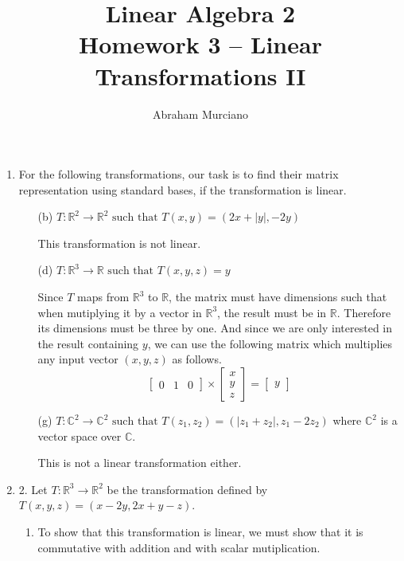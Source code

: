 \documentclass{article}
\title{Linear Algebra 2 \\
\medskip
\large Homework 3 -- Linear Transformations II}
\author{Abraham Murciano}
\newenvironment{answers}{ %
	\begin{enumerate}
		\setlength{\itemsep}{\bigskipamount}
}{\end{enumerate}}
\newcommand{\R}{\mathbb{R}}
\newcommand{\C}{\mathbb{C}}
\newcommand{\st}{\text{ such that }}
\begin{document}
\maketitle

\begin{answers}

	\item
		For the following transformations, our task is to find their matrix representation using standard bases, if the transformation is linear.
		\begin{enumerate}
			\item[(b)]
				\(T : \R^2 \to \R^2 \st T(x, y) = (2x + |y|, -2y)\)

				This transformation is not linear.

			\item[(d)]
				\(T : \R^3 \to \R \st T(x, y, z) = y\)

				Since \(T\) maps from \(\R^3\) to \(\R\), the matrix must have dimensions such that when mutiplying it by a vector in \(\R^3\), the result must be in \(\R\). Therefore its dimensions must be three by one. And since we are only interested in the result containing \(y\), we can use the following matrix which multiplies any input vector \((x, y, z)\) as follows.
				\begin{equation*}
					\left[ \begin{matrix}
							0 & 1 & 0
						\end{matrix} \right]
					\times
					\left[ \begin{matrix}
							x \\ y \\ z
						\end{matrix} \right]
					=
					\left[ \begin{matrix}
							y
						\end{matrix} \right]
				\end{equation*}

			\item[(g)]
				\(T : \C^2 \to \C^2 \st T(z_1, z_2) = (|z_1 + z_2|, z_1 - 2z_2)\) where \(\C^2\) is a vector space over \(\C\).

				This is not a linear transformation either.
		\end{enumerate}

	\item[2.]
		Let \(T : \R^3 \to \R^2\) be the transformation defined by \(T(x, y, z) = (x - 2y, 2x + y - z)\).
		\begin{enumerate}
			\item
				To show that this transformation is linear, we must show that it is commutative with addition and with scalar mutiplication.


\end{enumerate}
\end{answers}
\end{document}
